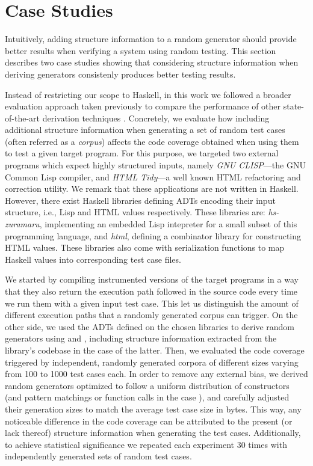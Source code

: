 \section{Case Studies}

Intuitively, adding structure information to a random generator should provide
better results when verifying a system using random testing.
%
%
This section describes two case studies showing that considering structure
information when deriving generators consistenly produces better testing
results.


Instead of restricting our scope to Haskell, in this work we followed a broader
evaluation approach taken previously to compare the performance of other
state-of-the-art derivation techniques
\cite{grieco2017,DBLP:conf/haskell/MistaRH18}.
%
Concretely, we evaluate how including additional structure information when
generating a set of random test cases (often referred as a \emph{corpus})
affects the code coverage obtained when using them to test a given target
program.
%
For this purpose, we targeted two external programs which expect highly
structured inputs, namely \emph{GNU CLISP}---the GNU Common Lisp compiler, and
\emph{HTML Tidy}---a well known HTML refactoring and correction utility.
%
We remark that these applications are not written in Haskell.
%
However, there exist Haskell libraries defining ADTs encoding their input
structure, i.e., Lisp and HTML values respectively. These libraries are:
\emph{hs-zuramaru}, implementing an embedded Lisp intepreter for a small subset
of this programming language, and \emph{html}, defining a combinator library for
constructing HTML values.
%
These libraries also come with serialization functions to map Haskell values
into corresponding test case files.



We started by compiling instrumented versions of the target programs in a way
that they also return the execution path followed in the source code every time
we run them with a given input test case.
%
This let us distinguish the amount of different execution paths that a randomly
generated corpus can trigger.
%
On the other side, we used the ADTs defined on the chosen libraries to derive
random generators using \dragen and \dragenp, including structure information
extracted from the library's codebase in the case of the latter.
%
Then, we evaluated the code coverage triggered by independent, randomly
generated corpora of different sizes varying from 100 to 1000 test cases each.
%
In order to remove any external bias, we derived random generators optimized to
follow a uniform distribution of constructors (and pattern matchings or function
calls in the case \dragenp), and carefully adjusted their generation sizes to
match the average test case size in bytes.
%
This way, any noticeable difference in the code coverage can be attributed to
the present (or lack thereof) structure information when generating the test
cases.
%
Additionally, to achieve statistical significance we repeated each experiment 30
times with independently generated sets of random test cases.

